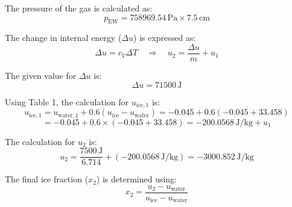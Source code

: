 The pressure of the gas is calculated as:
\[
p_{\text{EW}} = 758969.54 \, \text{Pa} \times 7.5 \, \text{cm}
\]

The change in internal energy (\( \Delta u \)) is expressed as:
\[
\Delta u = c_V \Delta T \quad \Rightarrow \quad u_2 = \frac{\Delta u}{m} + u_1
\]

The given value for \( \Delta u \) is:
\[
\Delta u = 71500 \, \text{J}
\]

Using Table 1, the calculation for \( u_{\text{ice},1} \) is:
\[
u_{\text{ice},1} = u_{\text{water},1} + 0.6 \left( u_{\text{ice}} - u_{\text{water}} \right) = -0.045 + 0.6 \left( -0.045 + 33.458 \right)
\]
\[
= -0.045 + 0.6 \times (-0.045 + 33.458) = -200.0568 \, \text{J/kg} + u_1
\]

The calculation for \( u_2 \) is:
\[
u_2 = \frac{7500 \, \text{J}}{6.714} + (-200.0568 \, \text{J/kg}) = -3000.852 \, \text{J/kg}
\]

The final ice fraction (\( x_2 \)) is determined using:
\[
x_2 = \frac{u_2 - u_{\text{water}}}{u_{\text{ice}} - u_{\text{water}}}
\]